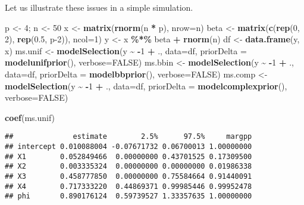 \documentclass[
]{book}
\newenvironment{Shaded}{\begin{snugshade}}{\end{snugshade}}
\newcommand{\AttributeTok}[1]{\textcolor[rgb]{0.13,0.29,0.53}{#1}}
\newcommand{\ConstantTok}[1]{\textcolor[rgb]{0.56,0.35,0.01}{#1}}
\newcommand{\DecValTok}[1]{\textcolor[rgb]{0.00,0.00,0.81}{#1}}
\newcommand{\FloatTok}[1]{\textcolor[rgb]{0.00,0.00,0.81}{#1}}
\newcommand{\FunctionTok}[1]{\textcolor[rgb]{0.13,0.29,0.53}{\textbf{#1}}}
\newcommand{\NormalTok}[1]{#1}
\newcommand{\OtherTok}[1]{\textcolor[rgb]{0.56,0.35,0.01}{#1}}
\newcommand{\SpecialCharTok}[1]{\textcolor[rgb]{0.81,0.36,0.00}{\textbf{#1}}}
\theoremstyle{definition}
\theoremstyle{definition}
\theoremstyle{definition}
\theoremstyle{definition}
\theoremstyle{remark}
\begin{document}
Let us illustrate these issues in a simple simulation.

\begin{Shaded}
\begin{Highlighting}[]
\NormalTok{p }\OtherTok{\textless{}{-}} \DecValTok{4}\NormalTok{; n }\OtherTok{\textless{}{-}} \DecValTok{50}
\NormalTok{x }\OtherTok{\textless{}{-}} \FunctionTok{matrix}\NormalTok{(}\FunctionTok{rnorm}\NormalTok{(n }\SpecialCharTok{*}\NormalTok{ p), }\AttributeTok{nrow=}\NormalTok{n)}
\NormalTok{beta }\OtherTok{\textless{}{-}} \FunctionTok{matrix}\NormalTok{(}\FunctionTok{c}\NormalTok{(}\FunctionTok{rep}\NormalTok{(}\DecValTok{0}\NormalTok{, }\DecValTok{2}\NormalTok{), }\FunctionTok{rep}\NormalTok{(}\FloatTok{0.5}\NormalTok{, p}\DecValTok{{-}2}\NormalTok{)), }\AttributeTok{ncol=}\DecValTok{1}\NormalTok{)}
\NormalTok{y }\OtherTok{\textless{}{-}}\NormalTok{ x }\SpecialCharTok{\%*\%}\NormalTok{ beta }\SpecialCharTok{+} \FunctionTok{rnorm}\NormalTok{(n)}
\NormalTok{df }\OtherTok{\textless{}{-}} \FunctionTok{data.frame}\NormalTok{(y, x)}
\NormalTok{ms.unif }\OtherTok{\textless{}{-}} \FunctionTok{modelSelection}\NormalTok{(y }\SpecialCharTok{\textasciitilde{}} \SpecialCharTok{{-}}\DecValTok{1} \SpecialCharTok{+}\NormalTok{ ., }\AttributeTok{data=}\NormalTok{df, }\AttributeTok{priorDelta =} \FunctionTok{modelunifprior}\NormalTok{(), }\AttributeTok{verbose=}\ConstantTok{FALSE}\NormalTok{)}
\NormalTok{ms.bbin }\OtherTok{\textless{}{-}} \FunctionTok{modelSelection}\NormalTok{(y }\SpecialCharTok{\textasciitilde{}} \SpecialCharTok{{-}}\DecValTok{1} \SpecialCharTok{+}\NormalTok{ ., }\AttributeTok{data=}\NormalTok{df, }\AttributeTok{priorDelta =} \FunctionTok{modelbbprior}\NormalTok{(), }\AttributeTok{verbose=}\ConstantTok{FALSE}\NormalTok{)}
\NormalTok{ms.comp }\OtherTok{\textless{}{-}} \FunctionTok{modelSelection}\NormalTok{(y }\SpecialCharTok{\textasciitilde{}} \SpecialCharTok{{-}}\DecValTok{1} \SpecialCharTok{+}\NormalTok{ ., }\AttributeTok{data=}\NormalTok{df, }\AttributeTok{priorDelta =} \FunctionTok{modelcomplexprior}\NormalTok{(), }\AttributeTok{verbose=}\ConstantTok{FALSE}\NormalTok{)}
\end{Highlighting}
\end{Shaded}

\begin{Shaded}
\begin{Highlighting}[]
\FunctionTok{coef}\NormalTok{(ms.unif)}
\end{Highlighting}
\end{Shaded}

\begin{verbatim}
##              estimate        2.5%      97.5%     margpp
## intercept 0.010088004 -0.07671732 0.06700013 1.00000000
## X1        0.052849466  0.00000000 0.43701525 0.17309500
## X2        0.003335324  0.00000000 0.00000000 0.01986338
## X3        0.458777850  0.00000000 0.75584664 0.91440091
## X4        0.717333220  0.44869371 0.99985446 0.99952478
## phi       0.890176124  0.59739527 1.33357635 1.00000000
\end{verbatim}
\end{document}

